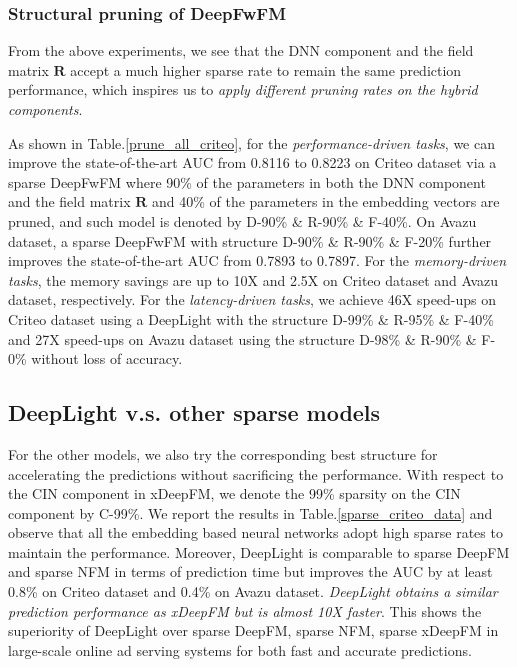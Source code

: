 \documentclass[sigconf]{acmart}
\begin{document}
\subsubsection{\textbf{Structural pruning of DeepFwFM}}
From the above experiments, we see that the DNN component and the field matrix $\bm{R}$ accept a much higher sparse rate to remain the same prediction performance, which inspires us to \emph{apply different pruning rates on the hybrid components}. 

As shown in Table.\ref{prune_all_criteo}, for the \emph{performance-driven tasks}, we can improve the state-of-the-art AUC from 0.8116 to 0.8223 on Criteo dataset via a sparse DeepFwFM where 90\% of the parameters in both the DNN component and the field matrix $\bm{R}$ and 40\% of the parameters in the embedding vectors are pruned, and such model is denoted by D-90\% \& R-90\% \& F-40\%. On Avazu dataset, a sparse DeepFwFM with structure D-90\% \& R-90\% \& F-20\% further improves the state-of-the-art AUC from 0.7893 to 0.7897. For the \emph{memory-driven tasks}, the memory savings are up to 10X and 2.5X on Criteo dataset and Avazu dataset, respectively. For the \emph{latency-driven tasks}, we achieve 46X speed-ups on Criteo dataset using a DeepLight with the structure D-99\% \& R-95\% \& F-40\% and 27X speed-ups on Avazu dataset using the structure D-98\% \& R-90\% \& F-0\% without loss of accuracy. 





\subsection{{DeepLight v.s. other sparse models}}

For the other models, we also try the corresponding best structure for accelerating the predictions without sacrificing the performance. With respect to the CIN component in xDeepFM, we denote the 99\% sparsity on the CIN component by C-99\%. We report the results in Table.\ref{sparse_criteo_data} and observe that all the embedding based neural networks adopt high sparse rates to maintain the performance. Moreover, DeepLight is comparable to sparse DeepFM and sparse NFM in terms of prediction time but improves the AUC by at least 0.8\% on Criteo dataset and 0.4\% on Avazu dataset. \emph{DeepLight obtains a similar prediction performance as xDeepFM but is almost 10X faster}. This shows the superiority of DeepLight over sparse DeepFM, sparse NFM, sparse xDeepFM in large-scale online ad serving systems for both fast and accurate predictions.
\end{document}
